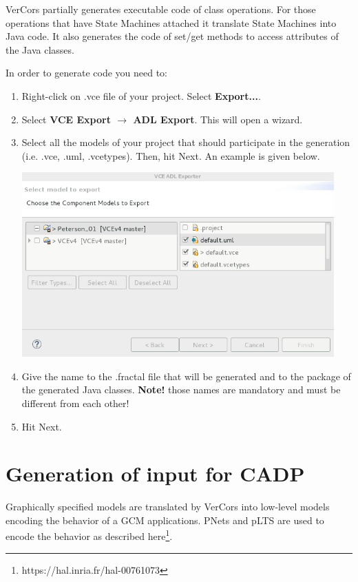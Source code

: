 \documentclass[12pt]{article}
\begin{document}
VerCors partially generates executable code of class operations. For those operations that have State Machines attached it translate State Machines into Java code. It also generates the code of set/get methods to access attributes of the Java classes.

In order to generate code you need to:
\begin{enumerate}
\item
Right-click on .vce file of your project. Select \textbf{Export...}. 
\item
Select \textbf{VCE Export $\rightarrow$ ADL Export}. This will open a wizard.
\item
Select all the models of your project that should participate in the generation (i.e. .vce, .uml, .vcetypes). Then, hit Next. An example is given below.

     \centerline{
     \includegraphics[width=12cm]{draws/code-gen.png}
     \label{fig:vce-proj}
     }
     
\item
Give the name to the .fractal file that will be generated and to the package of the generated Java classes. \textbf{Note! } those names are mandatory and must be different from each other!
\item
Hit Next. 

\end{enumerate}

\section{Generation of input for CADP}

Graphically specified models are translated by VerCors into low-level models encoding the behavior of a GCM applications. PNets and pLTS are used to encode the behavior as described here\footnote{https://hal.inria.fr/hal-00761073}.
\end{document}
